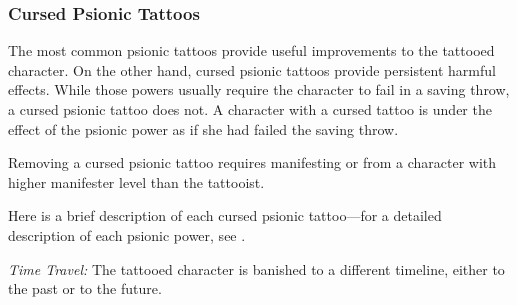 \subsubsection{Cursed Psionic Tattoos}
The most common psionic tattoos provide useful improvements to the tattooed character. On the other hand, cursed psionic tattoos provide persistent harmful effects. While those powers usually require the character to fail in a saving throw, a cursed psionic tattoo does not. A character with a cursed tattoo is under the effect of the psionic power as if she had failed the saving throw.

Removing a cursed psionic tattoo requires manifesting  or  from a character with higher manifester level than the tattooist.

Here is a brief description of each cursed psionic tattoo---for a detailed description of each psionic power, see .


\textit{Time Travel:} The tattooed character is banished to a different timeline, either to the past or to the future.




